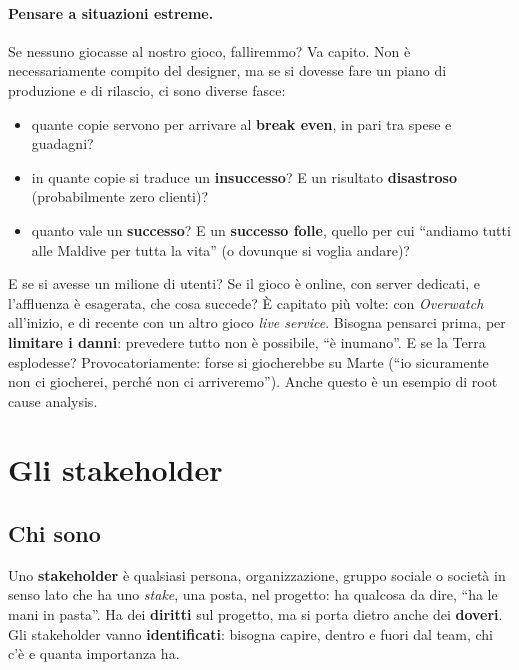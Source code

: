\paragraph{Pensare a situazioni estreme.} Se nessuno giocasse al nostro gioco,
falliremmo? Va capito. Non è necessariamente compito del designer, ma se si
dovesse fare un piano di produzione e di rilascio, ci sono diverse fasce:
\begin{itemize}
  \item quante copie servono per arrivare al \textbf{break even}, in pari tra
        spese e guadagni?
  \item in quante copie si traduce un \textbf{insuccesso}? E un risultato
        \textbf{disastroso} (probabilmente zero clienti)?
  \item quanto vale un \textbf{successo}? E un \textbf{successo folle}, quello
        per cui ``andiamo tutti alle Maldive per tutta la vita'' (o dovunque si
        voglia andare)?
\end{itemize}
E se si avesse un milione di utenti? Se il gioco è online, con server
dedicati, e l'affluenza è esagerata, che cosa succede? È capitato più volte:
con \emph{Overwatch} all'inizio, e di recente con un altro gioco \emph{live
service}. Bisogna pensarci prima, per \textbf{limitare i danni}: prevedere
tutto non è possibile, ``è inumano''. E se la Terra esplodesse?
Provocatoriamente: forse si giocherebbe su Marte (``io sicuramente non ci
giocherei, perché non ci arriveremo''). Anche questo è un esempio di root
cause analysis.

\section{Gli stakeholder}
\label{sec:stakeholder}



\subsection{Chi sono}

Uno \textbf{stakeholder} è qualsiasi persona, organizzazione, gruppo sociale
o società in senso lato che ha uno \emph{stake}, una posta, nel progetto: ha
qualcosa da dire, ``ha le mani in pasta''. Ha dei \textbf{diritti} sul
progetto, ma si porta dietro anche dei \textbf{doveri}. Gli stakeholder vanno
\textbf{identificati}: bisogna capire, dentro e fuori dal team, chi c'è e
quanta importanza ha.

